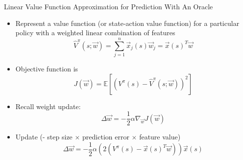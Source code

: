 \documentclass[aspectratio=169]{../latex_main/tntbeamer}  %
\begin{document}
\begin{frame}[c]{Linear Value Function Approximation for Prediction With
		An Oracle}
	
	
	\begin{itemize}
		\item Represent a value function (or state-action value function) for a
		particular policy with a weighted linear combination of features
		$$ \hat{V}^\pi(s; \vec{w}) = \sum_{j=1}^n \vec{x}_j (s) \vec{w}_j = \vec{x}(s)^T\vec{w}$$
		\item Objective function is 
		$$ J(\vec{w}) = \mathbb{E}[(V^\pi(s) - \hat{V}^\pi(s; \vec{w}))^2]$$
		\item Recall weight update:
		$$ \Delta \vec{w} = - \frac{1}{2} \alpha \nabla_{\vec{w}} J (\vec{w})$$
		\item Update (- step size $\times$ prediction error $\times$ feature value)
		$$ \Delta \vec{w} = -\frac{1}{2} \alpha(2(V^\pi(s) - \vec{x}(s)^T \vec{w})) \vec{x}(s)$$
		
	\end{itemize}
	
\end{frame}
\end{document}
